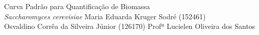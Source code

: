 \documentclass[12pt]{article}
\begin{document}
\capa
    {Curva Padrão para Quantificação de Biomassa\\[0.3cm]\textit{Saccharomyces cerevisiae}}
    {Maria Eduarda Kruger Sodré (152461) \\ Osvaldino Corrêa da Silveira Júnior (126170)}
    {Profª Lucielen Oliveira dos Santos}

\pagestyle{empty}
\tableofcontents
\newpage
\pagestyle{fancy}








\end{document}
